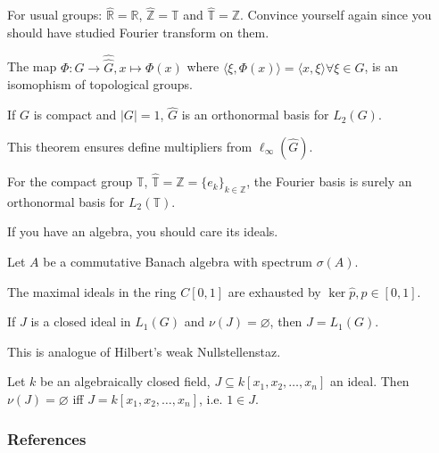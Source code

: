 \documentclass{beamer}
\def\T{\mathbb{T}}
\def\Z{\mathbb{Z}}
\def\R{\mathbb{R}}
\renewcommand{\hat}\widehat
\begin{document}
\begin{frame}[allowframebreaks]
    \begin{example}
      For usual groups: $\hat{\R}=\R$, $\hat{\Z}=\T$ and $\hat{\T}=\Z$. Convince yourself again since you should have studied Fourier transform on them.
    \end{example}
    

  \begin{theorem}
    The map $\Phi\colon G\to \hat{\hat{G}},x\mapsto \Phi(x)$ where $\langle\xi,\Phi(x)\rangle=\langle x,\xi\rangle\forall \xi\in\hat{G}$, is an isomophism of topological groups.
  \end{theorem}

  \begin{theorem}
    If $G$ is compact and $|G|=1$, $\hat{G}$ is an orthonormal basis for $L_2(G)$.\cite*[Corollary~4.27]{folland2016course}
  \end{theorem}
This theorem ensures define multipliers from $\ell_\infty(\hat{G})$.
  \begin{example}
    For the compact group $\T$, $\hat{\T}=\Z=\{e_k\}_{k\in\Z}$, the Fourier basis is surely an orthonormal basis for $L_2(\T)$.
  \end{example}
\end{frame}

\begin{frame}
If you have an algebra, you should care its ideals.
  \begin{definition}
    Let $A$ be a commutative Banach algebra with spectrum $\sigma(A)$.
  \end{definition}
  
  \begin{theorem}
    The maximal ideals in the ring $C[0,1]$ are exhausted by $\ker\hat{p}, p\in [0,1]$.
  \end{theorem}

  \begin{theorem}
    If ${J}$ is a closed ideal in $L_1(G)$ and $\nu ({J})=\varnothing$, then ${J}=L_1(G)$.
  \end{theorem}
This is analogue of Hilbert's weak Nullstellenstaz.
  \begin{theorem}
    Let $k$ be an algebraically closed field, $J\subseteq k[x_1,x_2,\ldots,x_n]$ an ideal. Then $\nu(J)=\varnothing$ iff $J=k[x_1,x_2,\ldots,x_n]$, i.e. $1\in J$.
  \end{theorem}
\end{frame}

\begin{frame}%
        \frametitle{References}
        \printbibliography
\end{frame}
\end{document}

